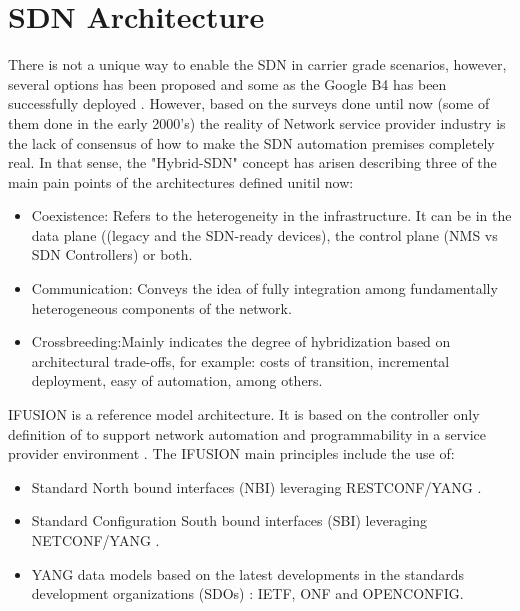 \documentclass[a4paper,fleqn]{cas-dc}
\begin{document}
\section{SDN Architecture}
\label{section:arq}

There is not a unique way to enable the SDN in carrier grade scenarios, however, several options has been proposed and some as the Google B4 has been successfully deployed \cite{jain2013b4,bakshi2013considerations,karakus2017survey}. However, based on the surveys done until now (some of them done in the early 2000's) \cite{campbell1999survey,sinha2017survey,boucadair2014software} the reality of Network service provider industry is the lack of consensus of how to make the SDN automation premises completely real. In that sense, the "Hybrid-SDN" concept has arisen describing three of the main pain points of the architectures defined unitil now: 
\begin{itemize}
    \item Coexistence: Refers to the heterogeneity in the infrastructure. It can be in the data plane ((legacy and the SDN-ready devices), the control plane (NMS vs SDN Controllers) or both. 
    \item Communication: Conveys the idea of fully integration among fundamentally heterogeneous components of the network.
    \item Crossbreeding:Mainly indicates the degree of hybridization based on architectural trade-offs, for example: costs of transition, incremental deployment, easy of automation, among others. 
\end{itemize}

\uppercase{iFUSION} is a reference model architecture. It is based on the controller only definition of \cite{sinha2017survey} to support network automation and programmability in a service provider environment \cite{contreras2019ifusion}. The \uppercase{iFUSION} main principles include the use of:
\begin{itemize}
    \item Standard North bound interfaces (NBI) leveraging \uppercase{RESTconf/YANG} \cite{bierman2017restconf}.
    \item Standard Configuration South bound interfaces (SBI) leveraging \uppercase{NETCONF/YANG} \cite{enns2011network}.
    \item YANG data models based on the latest developments in the standards development organizations (SDOs) \cite{bjorklund2016yang}: \uppercase{IETF}, \uppercase{ONF} and \uppercase{OpenConfig}.
\end{itemize}
\end{document}
